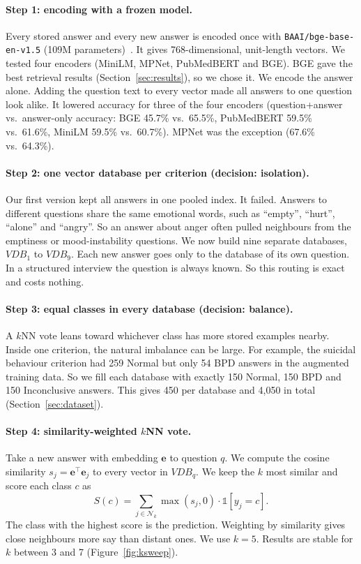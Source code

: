 \documentclass[11pt]{article}
\begin{document}
\paragraph{Step 1: encoding with a frozen model.}
Every stored answer and every new answer is encoded once with \texttt{BAAI/bge-base-en-v1.5}
(109M parameters)~\cite{xiao2023cpack}. It gives 768-dimensional, unit-length vectors. We tested
four encoders (MiniLM, MPNet, PubMedBERT and BGE). BGE gave the best retrieval results
(Section~\ref{sec:results}), so we chose it. We encode the answer alone. Adding the question text to
every vector made all answers to one question look alike. It lowered accuracy for three of the four
encoders (question+answer vs.\ answer-only accuracy: BGE 45.7\% vs.\ 65.5\%, PubMedBERT 59.5\% vs.\
61.6\%, MiniLM 59.5\% vs.\ 60.7\%). MPNet was the exception (67.6\% vs.\ 64.3\%).

\paragraph{Step 2: one vector database per criterion (decision: isolation).}
Our first version kept all answers in one pooled index. It failed. Answers to different questions
share the same emotional words, such as ``empty'', ``hurt'', ``alone'' and ``angry''. So an answer
about anger often pulled neighbours from the emptiness or mood-instability questions. We now build
nine separate databases, $VDB_1$ to $VDB_9$. Each new answer goes only to the database of its own
question. In a structured interview the question is always known. So this routing is exact and
costs nothing.

\paragraph{Step 3: equal classes in every database (decision: balance).}
A $k$NN vote leans toward whichever class has more stored examples nearby. Inside one criterion, the
natural imbalance can be large. For example, the suicidal behaviour criterion had 259 Normal but
only 54 BPD answers in the augmented training data. So we fill each database with exactly 150
Normal, 150 BPD and 150 Inconclusive answers. This gives 450 per database and 4,050 in total
(Section~\ref{sec:dataset}).

\paragraph{Step 4: similarity-weighted $k$NN vote.}
Take a new answer with embedding $\mathbf{e}$ to question $q$. We compute the cosine similarity
$s_j = \mathbf{e}^\top \mathbf{e}_j$ to every vector in $VDB_q$. We keep the $k$ most similar and
score each class $c$ as
\begin{equation}
S(c) = \sum_{j \in \mathcal{N}_k} \max(s_j, 0)\cdot \mathbb{1}[y_j = c].
\label{eq:voting}
\end{equation}
The class with the highest score is the prediction. Weighting by similarity gives close neighbours
more say than distant ones. We use $k=5$. Results are stable for $k$ between 3 and 7
(Figure~\ref{fig:ksweep}).
\end{document}
